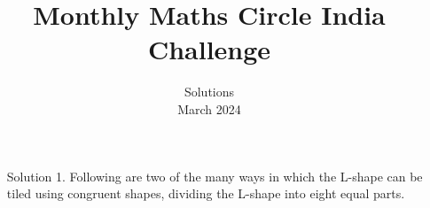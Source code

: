 \documentclass[a4paper,12pt]{article}
\title{Monthly Maths Circle India Challenge}
\date{Solutions\\March 2024}
\begin{document}
\maketitle
\thispagestyle{empty}
\begin{enumerate}
    \item[Solution 1.] Following are two of the many ways in which the L-shape can be tiled using congruent shapes, dividing the L-shape into eight equal parts.
    \begin{figure}[h]
        \centering
                        
    \end{figure}

\end{enumerate}
\end{document}

